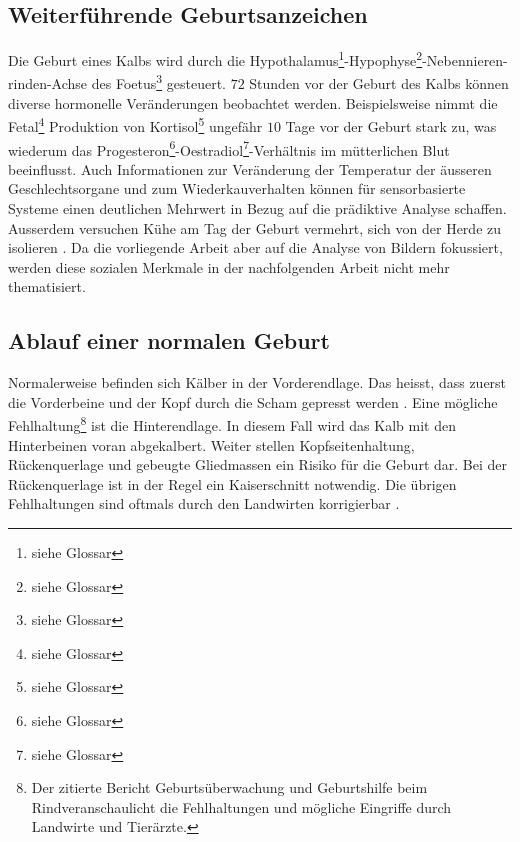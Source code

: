 \subsection{Weiterführende Geburtsanzeichen}
Die Geburt eines Kalbs wird durch die \gls{Hypothalamus}\footnote{siehe Glossar}-\gls{Hypophyse}\footnote{siehe Glossar}-Nebennieren-rinden-Achse des \gls{Foetus}\footnote{siehe Glossar} gesteuert. $72$ Stunden vor der Geburt des Kalbs können diverse hormonelle Veränderungen beobachtet werden. Beispielsweise nimmt die \gls{Fetal}\footnote{siehe Glossar} Produktion von Kortisol\footnote{siehe Glossar} ungefähr $10$ Tage vor der Geburt stark zu, was wiederum das \gls{Progesteron}\footnote{siehe Glossar}-\gls{Oestradiol}\footnote{siehe Glossar}-Verhältnis im mütterlichen Blut beeinflusst. Auch Informationen zur Veränderung der Temperatur der äusseren Geschlechtsorgane und zum Wiederkauverhalten können für sensorbasierte Systeme einen deutlichen Mehrwert in Bezug auf die prädiktive Analyse schaffen. Ausserdem versuchen Kühe am Tag der Geburt vermehrt, sich von der Herde zu isolieren \citep[S.1-4]{Saint-Dizier2015}. 
Da die vorliegende Arbeit aber auf die Analyse von Bildern fokussiert, werden diese sozialen Merkmale in der nachfolgenden Arbeit nicht mehr thematisiert. 
\subsection{Ablauf einer normalen Geburt}
Normalerweise befinden sich Kälber in der Vorderendlage. Das heisst, dass zuerst die Vorderbeine und der Kopf durch die Scham gepresst werden \citep{Muller2020}. Eine mögliche Fehlhaltung\footnote{Der zitierte Bericht \flqq Geburtsüberwachung und Geburtshilfe beim Rind\frqq veranschaulicht die Fehlhaltungen und mögliche Eingriffe durch Landwirte und Tierärzte.} ist die Hinterendlage. In diesem Fall wird das Kalb mit den Hinterbeinen voran abgekalbert. Weiter stellen Kopfseitenhaltung, Rückenquerlage und gebeugte Gliedmassen ein Risiko für die Geburt dar. Bei der Rückenquerlage ist in der Regel ein Kaiserschnitt notwendig. Die übrigen Fehlhaltungen sind oftmals durch den Landwirten korrigierbar \citep[S. 17, 24-26]{Traulsen2013}.

